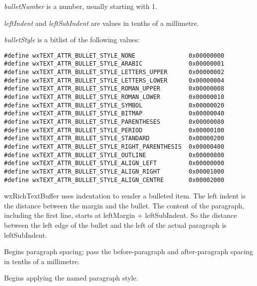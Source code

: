 {\it bulletNumber} is a number, usually starting with 1.

{\it leftIndent} and {\it leftSubIndent} are values in tenths of a millimetre.

{\it bulletStyle} is a bitlist of the following values:

{\small
\begin{verbatim}
#define wxTEXT_ATTR_BULLET_STYLE_NONE               0x00000000
#define wxTEXT_ATTR_BULLET_STYLE_ARABIC             0x00000001
#define wxTEXT_ATTR_BULLET_STYLE_LETTERS_UPPER      0x00000002
#define wxTEXT_ATTR_BULLET_STYLE_LETTERS_LOWER      0x00000004
#define wxTEXT_ATTR_BULLET_STYLE_ROMAN_UPPER        0x00000008
#define wxTEXT_ATTR_BULLET_STYLE_ROMAN_LOWER        0x00000010
#define wxTEXT_ATTR_BULLET_STYLE_SYMBOL             0x00000020
#define wxTEXT_ATTR_BULLET_STYLE_BITMAP             0x00000040
#define wxTEXT_ATTR_BULLET_STYLE_PARENTHESES        0x00000080
#define wxTEXT_ATTR_BULLET_STYLE_PERIOD             0x00000100
#define wxTEXT_ATTR_BULLET_STYLE_STANDARD           0x00000200
#define wxTEXT_ATTR_BULLET_STYLE_RIGHT_PARENTHESIS  0x00000400
#define wxTEXT_ATTR_BULLET_STYLE_OUTLINE            0x00000800
#define wxTEXT_ATTR_BULLET_STYLE_ALIGN_LEFT         0x00000000
#define wxTEXT_ATTR_BULLET_STYLE_ALIGN_RIGHT        0x00001000
#define wxTEXT_ATTR_BULLET_STYLE_ALIGN_CENTRE       0x00002000
\end{verbatim}
}

wxRichTextBuffer uses indentation to render a bulleted item. The left indent is the distance between
the margin and the bullet. The content of the paragraph, including the first line, starts
at leftMargin + leftSubIndent. So the distance between the left edge of the bullet and the
left of the actual paragraph is leftSubIndent.

\label{wxrichtextctrlbeginparagraphspacing}


Begins paragraph spacing; pass the before-paragraph and after-paragraph spacing in tenths of
a millimetre.

\label{wxrichtextctrlbeginparagraphstyle}


Begins applying the named paragraph style.

\label{wxrichtextctrlbeginrightindent}


